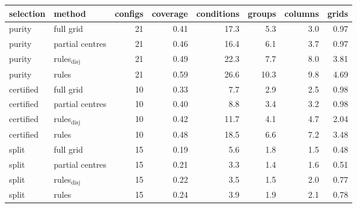\begin{tabular}{llrrrrrr}
\toprule
selection & method & configs & coverage & conditions & groups & columns & grids\\
\midrule
purity & full grid & 21 & 0.41 & 17.3 & 5.3 & 3.0 & 0.97\\
purity & partial centres & 21 & 0.46 & 16.4 & 6.1 & 3.7 & 0.97\\
purity & rules$_{\mathrm{disj}}$ & 21 & 0.49 & 22.3 & 7.7 & 8.0 & 3.81\\
purity & rules & 21 & 0.59 & 26.6 & 10.3 & 9.8 & 4.69\\
\midrule
certified & full grid & 10 & 0.33 & 7.7 & 2.9 & 2.5 & 0.98\\
certified & partial centres & 10 & 0.40 & 8.8 & 3.4 & 3.2 & 0.98\\
certified & rules$_{\mathrm{disj}}$ & 10 & 0.42 & 11.7 & 4.1 & 4.7 & 2.04\\
certified & rules & 10 & 0.48 & 18.5 & 6.6 & 7.2 & 3.48\\
\midrule
split & full grid & 15 & 0.19 & 5.6 & 1.8 & 1.5 & 0.48\\
split & partial centres & 15 & 0.21 & 3.3 & 1.4 & 1.6 & 0.51\\
split & rules$_{\mathrm{disj}}$ & 15 & 0.22 & 3.5 & 1.5 & 2.0 & 0.77\\
split & rules & 15 & 0.24 & 3.9 & 1.9 & 2.1 & 0.78\\
\bottomrule
\end{tabular}
